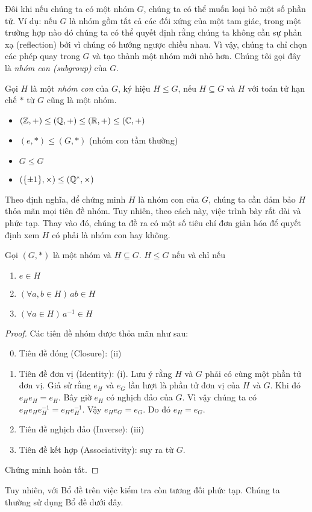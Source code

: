 Đôi khi nếu chúng ta có một nhóm $G$, chúng ta có thể muốn loại bỏ một số phần tử. Ví dụ: nếu $G$ là nhóm gồm tất cả các đối xứng của một tam giác, trong một trường hợp nào đó chúng ta có thể quyết định rằng chúng ta không cần sự phản xạ (reflection) bởi vì chúng có hướng ngược chiều nhau. Vì vậy, chúng ta chỉ chọn các phép quay trong $G$ và tạo thành một nhóm mới nhỏ hơn. Chúng tôi gọi đây là \emph{nhóm con (subgroup)} của $G$.

\begin{defi}
  Gọi $H$ là một \emph{nhóm con} của $G$, ký hiệu $H\leq G$, nếu $H\subseteq G$ và $H$ với toán tử hạn chế $*$ từ $G$ cũng là một nhóm.
\end{defi}
\begin{eg}\leavevmode
  \begin{itemize}
    \item $(\mathbb{Z}, +)\leq (\mathbb{Q}, +) \leq (\mathbb{R}, +)\leq (\mathbb{C}, +)$
    \item $({e}, *) \leq (G, *)$ (nhóm con tầm thường)
    \item $G \leq G$
    \item $(\{\pm 1\}, \times) \leq (\mathbb{Q}^*, \times)$
  \end{itemize}
\end{eg}

Theo định nghĩa, để chứng minh $H$ là nhóm con của $G$, chúng ta cần đảm bảo $H$ thỏa mãn mọi tiên đề nhóm. Tuy nhiên, theo cách này, việc trình bày rất dài và phức tạp. Thay vào đó, chúng ta đề ra có một số tiêu chí đơn giản hóa để quyết định xem $H$ có phải là nhóm con hay không.
\begin{lemma}
  Gọi $(G, *)$ là một nhóm và $H\subseteq G$. $H \leq G$ nếu và chỉ nếu
  \begin{enumerate}
    \item $e \in H$
    \item $(\forall a, b\in H)\,ab \in H$
    \item $(\forall a \in H)\,a^{-1} \in H$
  \end{enumerate}
\end{lemma}
\begin{proof}
  Các tiên đề nhóm được thỏa mãn như sau:
  \begin{enumerate}[label=\arabic{*}.]
      \setcounter{enumi}{-1}
    \item Tiên đề đóng (Closure): (ii)
    \item Tiên đề đơn vị (Identity): (i). Lưu ý rằng $H$ và $G$ phải có cùng một phần tử đơn vị. Giả sử rằng $e_H$ và $e_G$ lần lượt là phần tử đơn vị của $H$ và $G$. Khi đó $e_He_H = e_H$. Bây giờ $e_H$ có nghịch đảo của $G$. Vì vậy chúng ta có $e_He_He_H^{-1} = e_He_H^{-1}$. Vậy $e_He_G = e_G$. Do đó $e_H = e_G$.
    \item Tiên đề nghịch đảo (Inverse): (iii)
    \item Tiên đề kết hợp (Associativity): suy ra từ $G$.\qedhere
  \end{enumerate}
  Chứng minh hoàn tất.
\end{proof}
Tuy nhiên, với Bổ đề trên việc kiểm tra còn tương đối phức tạp. Chúng ta thường sử dụng Bổ đề dưới đây.

